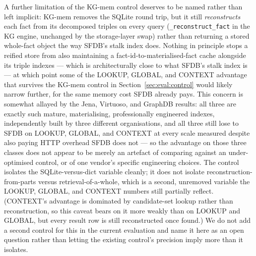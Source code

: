 A further limitation of the KG-mem control deserves to be named rather
than left implicit: KG-mem removes the SQLite round trip, but it still
\emph{reconstructs} each fact from its decomposed triples on every query
(\texttt{\_reconstruct\_fact} in the KG engine, unchanged by the
storage-layer swap) rather than returning a stored whole-fact object the
way SFDB's stalk index does. Nothing in principle stops a reified store
from also maintaining a fact-id-to-materialised-fact cache alongside its
triple indexes --- which is architecturally close to what SFDB's stalk
index is --- at which point some of the LOOKUP, GLOBAL, and CONTEXT advantage that
survives the KG-mem control in Section~\ref{sec:eval:control} would
likely narrow further, for the same memory cost SFDB already pays. This
concern is somewhat allayed by the Jena, Virtuoso, and GraphDB results:
all three are
exactly such mature, materialising, professionally engineered indexes,
independently built by three different organisations, and all three
still lose to SFDB on LOOKUP, GLOBAL, and CONTEXT at every scale measured despite
also paying HTTP overhead SFDB does not --- so the advantage on those three
classes does not appear to be merely an artefact of comparing against an
under-optimised control, or of one vendor's specific engineering
choices. The control isolates the SQLite-versus-dict variable cleanly; it does not
isolate reconstruction-from-parts versus retrieval-of-a-whole, which is
a second, unremoved variable the LOOKUP, GLOBAL, and CONTEXT numbers still
partially reflect. (CONTEXT's advantage is dominated by candidate-set
lookup rather than reconstruction, so this caveat bears on it more weakly
than on LOOKUP and GLOBAL, but every result row is still reconstructed
once found.) We do not add a second control for this in the
current evaluation and name it here as an open question rather than
letting the existing control's precision imply more than it isolates.
